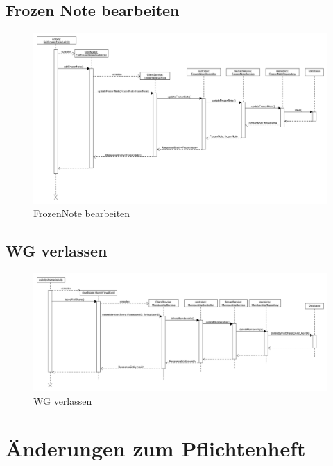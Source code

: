 \documentclass[a4paper]{scrreprt}
\begin{document}
	      
	      	
		
	      
		\section{Frozen Note bearbeiten}
 	\begin{figure}[H]
	       \centering
	       \includegraphics[scale = .35]{Sequenzdiagram_EditFrozenNote.png}
	       \caption{FrozenNote bearbeiten}
	      \end{figure}	
	      
	      	
		
		\section{WG verlassen}
		 \begin{figure}[H]
	       \centering
	       \includegraphics[scale = .35]{SD_WG_verlassen.png}
	       \caption{WG verlassen}
	      \end{figure}
	      	
	      

\chapter{Änderungen zum Pflichtenheft}
	
\end{document}
